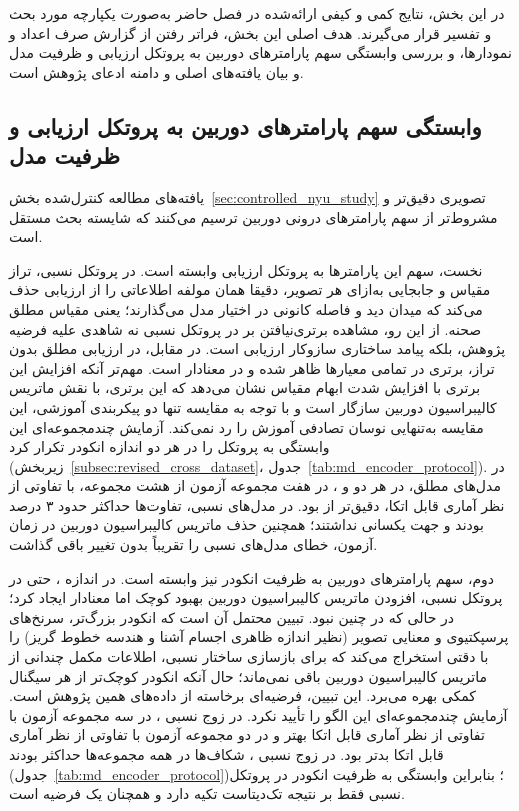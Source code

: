 در این بخش، نتایج کمی و کیفی ارائه‌شده در فصل حاضر
به‌صورت یکپارچه مورد بحث و تفسیر قرار می‌گیرند.
هدف اصلی این بخش،
فراتر رفتن از گزارش صرف اعداد و نمودارها،
و بررسی وابستگی سهم پارامترهای دوربین به پروتکل ارزیابی و ظرفیت مدل و بیان یافته‌های اصلی و دامنه ادعای پژوهش است.

\subsection{وابستگی سهم پارامترهای دوربین به پروتکل ارزیابی و ظرفیت مدل}
\label{subsec:protocol_capacity_dependence}

یافته‌های مطالعه کنترل‌شده بخش~\ref{sec:controlled_nyu_study}
تصویری دقیق‌تر و مشروط‌تر از سهم پارامترهای درونی دوربین ترسیم می‌کنند
که شایسته بحث مستقل است.

نخست، سهم این پارامترها به پروتکل ارزیابی وابسته است.
در پروتکل نسبی، تراز مقیاس و جابجایی به‌ازای هر تصویر،
دقیقا همان مولفه اطلاعاتی را از ارزیابی حذف می‌کند
که میدان دید و فاصله کانونی در اختیار مدل می‌گذارند؛
یعنی مقیاس مطلق صحنه.
از این رو، مشاهده برتری‌نیافتن \proposedmodel{} بر \controlmodel{}
در پروتکل نسبی 
نه شاهدی علیه فرضیه پژوهش،
بلکه پیامد ساختاری سازوکار ارزیابی است.
در مقابل، در ارزیابی مطلق بدون تراز،
برتری \proposedmodel{} در تمامی معیارها ظاهر شده
و در  معنادار است.
مهم‌تر آنکه افزایش این برتری با افزایش شدت ابهام مقیاس
 نشان می‌دهد که این برتری، با نقش ماتریس کالیبراسیون دوربین سازگار است
و با توجه به مقایسه تنها دو پیکربندی آموزشی، این مقایسه به‌تنهایی نوسان تصادفی آموزش را رد نمی‌کند.
آزمایش چندمجموعه‌ای این وابستگی به پروتکل را در هر دو اندازه انکودر تکرار کرد (زیربخش~\ref{subsec:revised_cross_dataset}، جدول~\ref{tab:md_encoder_protocol}). در مدل‌های مطلق، در هر دو  و ، \proposedmodel{} در هفت مجموعه آزمون از هشت مجموعه، با تفاوتی از نظر آماری قابل اتکا، دقیق‌تر از \controlmodel{} بود. در مدل‌های نسبی، تفاوت‌ها حداکثر حدود ۳ درصد بودند و جهت یکسانی نداشتند؛ همچنین حذف ماتریس کالیبراسیون دوربین در زمان آزمون، خطای مدل‌های نسبی را تقریباً بدون تغییر باقی گذاشت.

دوم، سهم پارامترهای دوربین به ظرفیت انکودر نیز وابسته است.
در اندازه ، حتی در پروتکل نسبی،
افزودن ماتریس کالیبراسیون دوربین بهبود کوچک اما معنادار ایجاد کرد؛
در حالی که در  چنین نبود.
تبیین محتمل آن است که انکودر بزرگ‌تر،
سرنخ‌های پرسپکتیوی و معنایی تصویر
(نظیر اندازه ظاهری اجسام آشنا و هندسه خطوط گریز)
را با دقتی استخراج می‌کند که برای بازسازی ساختار نسبی،
اطلاعات مکمل چندانی از ماتریس کالیبراسیون دوربین باقی نمی‌ماند؛
حال آنکه انکودر کوچک‌تر از هر سیگنال کمکی بهره می‌برد.
این تبیین، فرضیه‌ای برخاسته از داده‌های همین پژوهش است.
آزمایش چندمجموعه‌ای این الگو را تأیید نکرد. در زوج نسبی ، \proposedmodel{} در سه مجموعه آزمون با تفاوتی از نظر آماری قابل اتکا بهتر و در دو مجموعه آزمون با تفاوتی از نظر آماری قابل اتکا بدتر بود. در زوج نسبی ، شکاف‌ها در همه مجموعه‌ها حداکثر   بودند (جدول~\ref{tab:md_encoder_protocol})؛ بنابراین وابستگی به ظرفیت انکودر در پروتکل نسبی فقط بر نتیجه تک‌دیتاست  تکیه دارد و همچنان یک فرضیه است.

